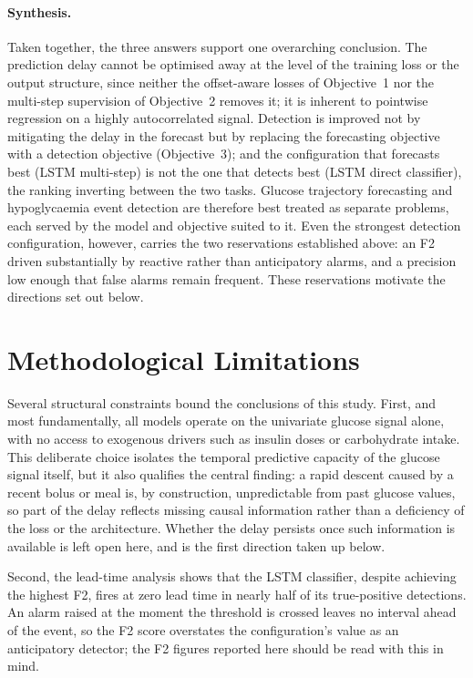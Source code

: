 \paragraph{Synthesis.}
Taken together, the three answers support one overarching conclusion. The prediction delay cannot be optimised away at the level of the training loss or the output structure, since neither the offset-aware losses of Objective~1 nor the multi-step supervision of Objective~2 removes it; it is inherent to pointwise regression on a highly autocorrelated signal. Detection is improved not by mitigating the delay in the forecast but by replacing the forecasting objective with a detection objective (Objective~3); and the configuration that forecasts best (LSTM multi-step) is not the one that detects best (LSTM direct classifier), the ranking inverting between the two tasks. Glucose trajectory forecasting and hypoglycaemia event detection are therefore best treated as separate problems, each served by the model and objective suited to it. Even the strongest detection configuration, however, carries the two reservations established above: an F2 driven substantially by reactive rather than anticipatory alarms, and a precision low enough that false alarms remain frequent. These reservations motivate the directions set out below.

\section{Methodological Limitations}
\label{sec:conc:limitations}

Several structural constraints bound the conclusions of this study. First, and most fundamentally, all models operate on the univariate glucose signal alone, with no access to exogenous drivers such as insulin doses or carbohydrate intake. This deliberate choice isolates the temporal predictive capacity of the glucose signal itself, but it also qualifies the central finding: a rapid descent caused by a recent bolus or meal is, by construction, unpredictable from past glucose values, so part of the delay reflects missing causal information rather than a deficiency of the loss or the architecture. Whether the delay persists once such information is available is left open here, and is the first direction taken up below.

Second, the lead-time analysis shows that the LSTM classifier, despite achieving the highest F2, fires at zero lead time in nearly half of its true-positive detections. An alarm raised at the moment the threshold is crossed leaves no interval ahead of the event, so the F2 score overstates the configuration's value as an anticipatory detector; the F2 figures reported here should be read with this in mind.

